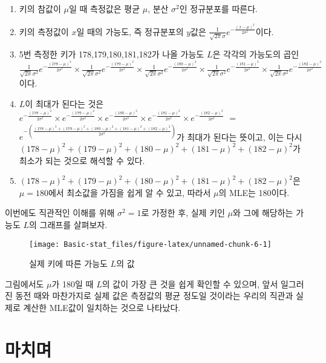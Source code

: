 \documentclass[]{book}
\providecommand{\tightlist}{%
  \setlength{\itemsep}{0pt}\setlength{\parskip}{0pt}}
\begin{document}
\begin{enumerate}
\def\labelenumi{\arabic{enumi}.}
\tightlist
\item
  키의 참값이 \(\mu\)일 때 측정값은 평균 \(\mu\), 분산 \(\sigma^2\)인
  정규분포를 따른다.
\item
  키의 측정값이 \(x\)일 때의 가능도, 즉 정규분포의 \(y\)값은
  \(\frac{1}{\sqrt{2\pi}\sigma}e^{-\frac{(x-\mu)^2}{2\sigma^2}}\)이다.
\item
  5번 측정한 키가 178,179,180,181,182가 나올 가능도 \(L\)은 각각의
  가능도의 곱인
  \(\frac{1}{\sqrt{2\pi}\sigma^2}e^{-\frac{(178-\mu)^2}{2\sigma^2}}\times\frac{1}{\sqrt{2\pi}\sigma^2}e^{-\frac{(179-\mu)^2}{2\sigma^2}}\times\frac{1}{\sqrt{2\pi}\sigma^2}e^{-\frac{(180-\mu)^2}{2\sigma^2}}\times\frac{1}{\sqrt{2\pi}\sigma^2}e^{-\frac{(181-\mu)^2}{2\sigma^2}}\times\frac{1}{\sqrt{2\pi}\sigma^2}e^{-\frac{(182-\mu)^2}{2\sigma^2}}\)이다.
\item
  \(L\)이 최대가 된다는 것은
  \(e^{-\frac{(178-\mu)^2}{2\sigma^2}}\times e^{-\frac{(179-\mu)^2}{2\sigma^2}}\times e^{-\frac{(180-\mu)^2}{2\sigma^2}}\times e^{-\frac{(181-\mu)^2}{2\sigma^2}}\times e^{-\frac{(182-\mu)^2}{2\sigma^2}}\)
  \(=\)
  \(e^{-(\frac{(178-\mu)^2+(179-\mu)^2+(180-\mu)^2+(181-\mu)^2+(182-\mu)^2}{2\sigma^2})}\)가
  최대가 된다는 뜻이고, 이는 다시
  \((178-\mu)^2+(179-\mu)^2+(180-\mu)^2+(181-\mu)^2+(182-\mu)^2\)가
  최소가 되는 것으로 해석할 수 있다.
\item
  \((178-\mu)^2+(179-\mu)^2+(180-\mu)^2+(181-\mu)^2+(182-\mu)^2\)은
  \(\mu=180\)에서 최소값을 가짐을 쉽게 알 수 있고, 따라서 \(\mu\)의
  MLE는 180이다.
\end{enumerate}

이번에도 직관적인 이해를 위해 \(\sigma^2=1\)로 가정한 후, 실제 키인
\(\mu\)와 그에 해당하는 가능도 \(L\)의 그래프를 살펴보자.

\begin{figure}

{\centering \texttt{[image: Basic-stat\_files/figure-latex/unnamed-chunk-6-1]} 

}

\caption{실제 키에 따른 가능도 $L$의 값}\label{fig:unnamed-chunk-6}
\end{figure}

그림에서도 \(\mu\)가 180일 때 \(L\)의 값이 가장 큰 것을 쉽게 확인할 수
있으며, 앞서 일그러진 동전 때와 마찬가지로 실제 값은 측정값의 평균
정도일 것이라는 우리의 직관과 실제로 계산한 MLE값이 일치하는 것으로
나타났다.

\section{마치며}\label{uxb9c8uxce58uxba70}
\end{document}
